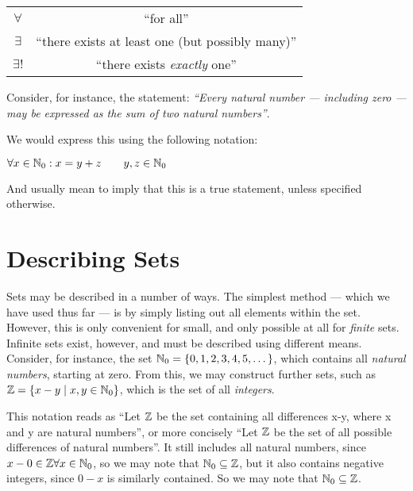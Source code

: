 \begin{tcolorbox}[colframe=gray!80, colback=white, boxrule=0.4pt, top=4pt, bottom=4pt]
  \begin{minipage}[t]{\textwidth}
    \centering
    \vspace{-10pt}
    \vspace{3pt}
    \begin{tabular}{cc}
      \(\forall\) & ``for all''\\
      \(\exists\) & ``there exists at least one (but possibly many)''\\
      \(\exists\mathpunct{!}\) & ``there exists \emph{exactly} one''
    \end{tabular}
  \end{minipage}
\end{tcolorbox}

 \begin{example}
   [Quantifiers]
 Consider, for instance, the statement: \emph{``Every natural number --- including
 zero ---  may be expressed as the sum of two natural numbers''}.

We would express this using the following notation:
\begin{center}
  \(\forall x \in \mathbb{N}_0 : x = y + z \qquad y,z\in\mathbb{N}_0\)
\end{center}

And usually mean to imply that this is a true statement, unless specified otherwise.
\end{example}

\section{Describing Sets}
Sets may be described in a number of ways.
The simplest method --- which we have used thus far --- is by simply listing out
all elements within the set.
However, this is only convenient for small, and only possible at all for
\emph{finite} sets.
Infinite sets exist, however, and must be described using different means.
Consider, for instance, the set \(\mathbb{N}_{0} = \{0,1,2,3,4,5,\dots\}\),
which contains all \emph{natural numbers}, starting at zero.
From this, we may construct further sets, such as
\(\mathbb{Z} = \{x-y \mid x, y \in \mathbb{N}_0\}\), which is the set of all
\emph{integers}.
\begin{remark}
  This notation reads as ``Let \(\mathbb{Z}\) be the set containing all differences
  x-y, where x and y are natural numbers'', or more concisely ``Let \(\mathbb{Z}\)
  be the set of all possible differences of natural numbers''. It still includes
  all natural numbers, since \(x - 0 \in \mathbb{Z} \forall x \in \mathbb{N}_0\), so we may
  note that \(\mathbb{N}_0 \subseteq \mathbb{Z}\), but it also contains negative integers, since \(0 - x\)
  is similarly contained.
  So we may note that \(\mathbb{N}_0 \subseteq \mathbb{Z}\).
\end{remark}

